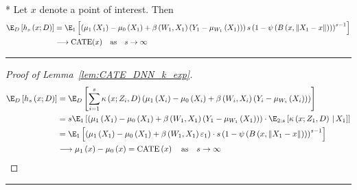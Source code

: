 \begin{lem}\label{lem:CATE_DNN_k_exp}\mbox{}\\*
	Let $x$ denote a point of interest.
	Then
	\begin{equation}
		\begin{aligned}
			\E_D\left[h_s\left(x; D\right)\right]
			& = \E_{1}\left[\left(\mu_{1}\left(X_1\right) - \mu_{0}\left(X_1\right) + \beta\left(W_{1}, X_1\right)\left(Y_{1} - \mu_{W_{1}}\left(X_1\right)\right)\right)
			s\left(1 - \psi\left(B\left(x, \|X_1 - x\|\right)\right)\right)^{s-1}\right]\\
			& \longrightarrow \operatorname{CATE}(x) \quad \text{as} \quad s \rightarrow \infty
		\end{aligned}
	\end{equation}
\end{lem}
\hrule
\begin{proof}[Proof of Lemma~\ref{lem:CATE_DNN_k_exp}]
	\begin{equation}
		\begin{aligned}
			\E_D\left[h_s\left(x; D\right)\right]
			& = \E_D\left[\sum_{i = 1}^{s} \kappa\left(x; Z_{i}, D\right) \left(\mu_{1}\left(X_{i}\right) - \mu_{0}\left(X_{i}\right) + \beta\left(W_{i}, X_{i}\right)\left(Y_{i} - \mu_{W_{i}}\left(X_{i}\right)\right)\right)\right]\\
			& = s \E_{1}\left[\left(\mu_{1}\left(X_1\right) - \mu_{0}\left(X_1\right) + \beta\left(W_{1}, X_1\right)\left(Y_{1} - \mu_{W_{1}}\left(X_1\right)\right)\right)
			\cdot \E_{2:s}\left[\kappa\left(x; Z_1, D\right)\, | \, X_1 \right]\right]\\
			& = \E_{1}\left[\left(\mu_{1}\left(X_1\right) - \mu_{0}\left(X_1\right) + \beta\left(W_{1}, X_1\right)\varepsilon_1\right)
			\cdot s\left(1 - \psi\left(B\left(x, \|X_1 - x\|\right)\right)\right)^{s-1}\right]\\
			& \longrightarrow \mu_{1}\left(x\right) - \mu_{0}\left(x\right)
			= \operatorname{CATE}\left(x\right) 
			\quad \text{as} \quad s \rightarrow \infty
		\end{aligned}
	\end{equation}
\end{proof}

\hrule

